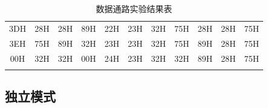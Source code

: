 \documentclass[../main.tex]{subfiles}
\begin{document}
\begin{enumerate}
\begin{table}[h]
\begin{tabular}{ccccccccccc}
                  3DH                          & 28H       & 28H       & 89H       & 22H & 23H & 32H         & 75H   & 28H   & 28H   & 75H   \\
                  3EH                          & 75H       & 89H       & 32H       & 23H & 23H & 32H         & 75H   & 89H   & 28H   & 75H   \\
                  00H                          & 32H       & 32H       & 00H       & 24H & 23H & 32H         & 32H   & 89H   & 28H   & 75H   \\ \Xhline{1pt}
              \end{tabular}
              \caption{数据通路实验结果表}
              \label{tab:3.1}
          \end{table}

\end{enumerate}

\subsection{独立模式}
\end{document}

